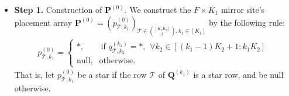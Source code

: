 \documentclass[onecolumn,10pt]{IEEEtran}
\theoremstyle{mythm}
\begin{document}
{%
\begin{itemize}
\item{\bf Step 1.} Construction of $\mathbf{P}^{(0)}$. We construct the $F\times K_1$ mirror site's placement array $\mathbf{P}^{(0)}=(p^{(0)}_{\mathcal{T},k_1})_{\mathcal{T}\in {[K_1K_2]\choose t},k_1\in[K_1]}$ by the following rule:
\begin{eqnarray}
\label{eq-mirror-cache1}
p^{(0)}_{\mathcal{T},k_1}=\left\{\begin{array}{cl}
                  *, & ~\text{if~} q^{(k_1)}_{\mathcal{T},k_2}=*, \begin{array}{c} \forall k_2\in[(k_1-1)K_2+1:k_1K_2]
                                  \end{array}
                                  \\
                  \text{null}, &  \text{otherwise}.
                \end{array}\right.
\end{eqnarray}That is,  let $p^{(0)}_{\mathcal{T},k_1}$ be a star if the     row $\mathcal{T}$ of $\mathbf{Q}^{(k_1)}$  is a star row,  and be null otherwise.



\end{itemize}}
\end{document}
